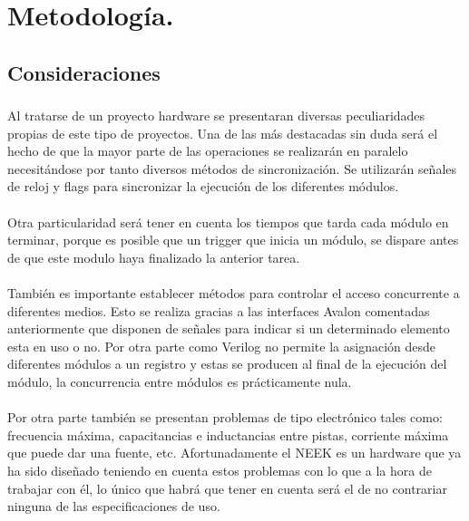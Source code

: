 \documentclass[a4paper,12pt,titlepage,final]{book}
\begin{document}
\section{Metodología.}
\subsection{Consideraciones}
\subsubsection*{}

\paragraph{}
Al tratarse de un proyecto hardware se presentaran diversas peculiaridades propias de este tipo de proyectos. Una de las más destacadas sin duda será el hecho de que la mayor parte de las operaciones se realizarán en paralelo necesitándose por tanto diversos métodos de sincronización. Se utilizarán señales de reloj y flags para sincronizar la ejecución de los diferentes módulos.

\paragraph{}
Otra particularidad será tener en cuenta los tiempos que tarda cada módulo en terminar, porque es posible que un trigger que inicia un módulo, se dispare antes de que este modulo haya finalizado la anterior tarea.

\paragraph{}
También es importante establecer métodos para controlar el acceso concurrente a diferentes medios. Esto se realiza gracias a las interfaces Avalon comentadas anteriormente que disponen de señales para indicar si un determinado elemento esta en uso o no. Por otra parte como Verilog no permite la asignación desde diferentes módulos a un registro y estas se producen al final de la ejecución del módulo, la concurrencia entre módulos es prácticamente nula.

\paragraph{}
Por otra parte también se presentan problemas de tipo electrónico tales como: frecuencia máxima, capacitancias e inductancias entre pistas, corriente máxima que puede dar una fuente, etc. Afortunadamente el NEEK es un hardware que ya ha sido diseñado teniendo en cuenta estos problemas con lo que a la hora de trabajar con él, lo único que habrá que tener en cuenta será el de no contrariar ninguna de las especificaciones de uso.
\end{document}
